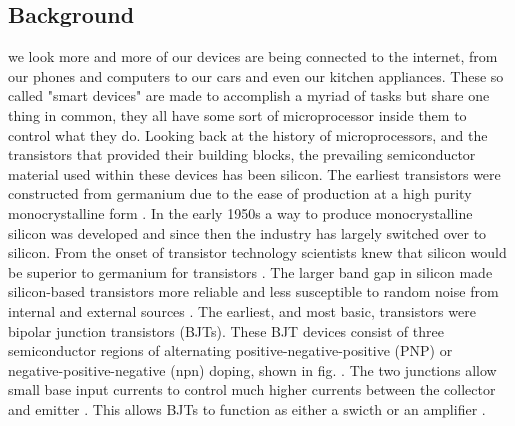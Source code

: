 \documentclass[conference]{IEEEtran}
\begin{document}
\subsection{Background}

 we look more and more of our devices are being connected to the internet, from our phones
and computers to our cars and even our kitchen appliances. These so called "smart devices" are made
to accomplish a myriad of tasks but share one thing in common, they all have some sort of microprocessor
inside them to control what they do. Looking back at the history of microprocessors, and the transistors
that provided their building blocks, the prevailing semiconductor material used within these devices has
been silicon. The earliest transistors were constructed from germanium due to the ease of production at
a high purity monocrystalline form \cite{Early2001}. In the early 1950s a way to produce monocrystalline silicon was
developed and since then the industry has largely switched over to silicon. From the onset of transistor technology
scientists knew that silicon would be superior to germanium for transistors \cite{Jenkins2005}. The larger band gap in
silicon made silicon-based transistors more reliable and less susceptible to random noise from internal
and external sources \cite{Early2001,Jenkins2005}. The earliest, and most basic, transistors were bipolar junction transistors (BJTs).
These BJT devices consist of three semiconductor regions of alternating positive-negative-positive (PNP) or
negative-positive-negative (npn) doping, shown in fig. \cite{sze_physics_2007}. The two junctions allow small base input currents
to control much higher currents between the collector and emitter \cite{sze_physics_2007}. This allows BJTs to function
as either a swicth or an amplifier \cite{horowitz_art_2015}.
\end{document}
